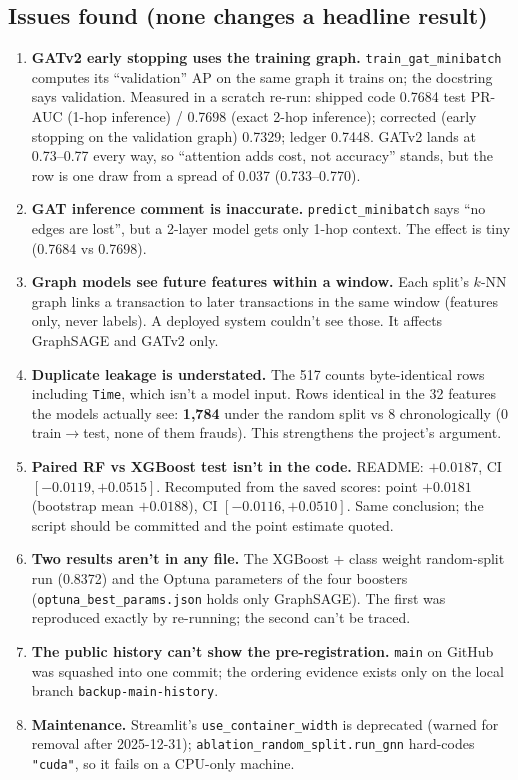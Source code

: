 \documentclass[11pt,a4paper]{article}
\begin{document}
\subsection{Issues found (none changes a headline result)}
\begin{enumerate}[leftmargin=1.0cm]
\item \textbf{GATv2 early stopping uses the training graph.} \texttt{train\_gat\_minibatch} computes its
``validation'' AP on the same graph it trains on; the docstring says validation. Measured in a scratch
re-run: shipped code 0.7684 test PR-AUC (1-hop inference) / 0.7698 (exact 2-hop inference); corrected
(early stopping on the validation graph) 0.7329; ledger 0.7448. GATv2 lands at 0.73--0.77 every way,
so ``attention adds cost, not accuracy'' stands, but the row is one draw from a spread of 0.037 (0.733--0.770).
\item \textbf{GAT inference comment is inaccurate.} \texttt{predict\_minibatch} says ``no edges are lost'',
but a 2-layer model gets only 1-hop context. The effect is tiny (0.7684 vs 0.7698).
\item \textbf{Graph models see future features within a window.} Each split's $k$-NN graph links a
transaction to later transactions in the same window (features only, never labels). A deployed
system couldn't see those. It affects GraphSAGE and GATv2 only.
\item \textbf{Duplicate leakage is understated.} The 517 counts byte-identical rows including
\texttt{Time}, which isn't a model input. Rows identical in the 32 features the models actually see:
\textbf{1,784} under the random split vs 8 chronologically (0 train$\to$test, none of them frauds). This
strengthens the project's argument.
\item \textbf{Paired RF vs XGBoost test isn't in the code.} README: $+0.0187$, CI $[-0.0119, +0.0515]$.
Recomputed from the saved scores: point $+0.0181$ (bootstrap mean $+0.0188$), CI $[-0.0116, +0.0510]$.
Same conclusion; the script should be committed and the point estimate quoted.
\item \textbf{Two results aren't in any file.} The XGBoost + class weight random-split run (0.8372) and
the Optuna parameters of the four boosters (\texttt{optuna\_best\_params.json} holds only GraphSAGE).
The first was reproduced exactly by re-running; the second can't be traced.
\item \textbf{The public history can't show the pre-registration.} \texttt{main} on GitHub was squashed
into one commit; the ordering evidence exists only on the local branch \texttt{backup-main-history}.
\item \textbf{Maintenance.} Streamlit's \texttt{use\_container\_width} is deprecated (warned for removal
after 2025-12-31); \texttt{ablation\_random\_split.run\_gnn} hard-codes \texttt{"cuda"}, so it fails on a
CPU-only machine.
\end{enumerate}
\end{document}
